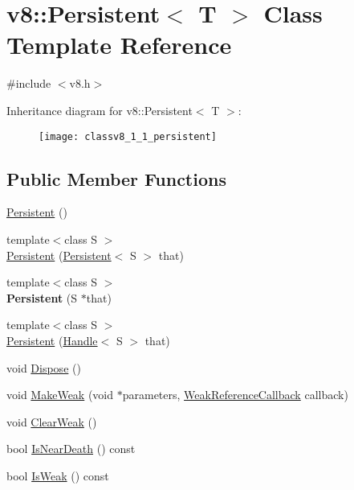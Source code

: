 \hypertarget{classv8_1_1_persistent}{}\section{v8\+:\+:Persistent$<$ T $>$ Class Template Reference}
\label{classv8_1_1_persistent}


{\ttfamily \#include $<$v8.\+h$>$}

Inheritance diagram for v8\+:\+:Persistent$<$ T $>$\+:\begin{figure}[H]
\begin{center}
\leavevmode
\texttt{[image: classv8\_1\_1\_persistent]}
\end{center}
\end{figure}
\subsection*{Public Member Functions}
\begin{DoxyCompactItemize}
\item 
\hyperlink{classv8_1_1_persistent_aff7516636baaf209885220f7cff34463}{Persistent} ()
\item 
{\footnotesize template$<$class S $>$ }\\\hyperlink{classv8_1_1_persistent_aea24de4ad0e6cd8e102411e11fbc3948}{Persistent} (\hyperlink{classv8_1_1_persistent}{Persistent}$<$ S $>$ that)
\item 
\hypertarget{classv8_1_1_persistent_a8050e41b31d6fbdf967957d6f5db2205}{}{\footnotesize template$<$class S $>$ }\\{\bfseries Persistent} (S $\ast$that)\label{classv8_1_1_persistent_a8050e41b31d6fbdf967957d6f5db2205}

\item 
{\footnotesize template$<$class S $>$ }\\\hyperlink{classv8_1_1_persistent_a89b49f1b1903a2d625d5c3100238276e}{Persistent} (\hyperlink{classv8_1_1_handle}{Handle}$<$ S $>$ that)
\item 
void \hyperlink{classv8_1_1_persistent_a33e53191844272ba0f2da4f55fc12297}{Dispose} ()
\item 
void \hyperlink{classv8_1_1_persistent_ab04609812113450bece2640ad0b27658}{Make\+Weak} (void $\ast$parameters, \hyperlink{namespacev8_a4d5db775dbc002b23f1b55ec7ce80ea5}{Weak\+Reference\+Callback} callback)
\item 
void \hyperlink{classv8_1_1_persistent_a30806c1125371c269a02ec03d47c69ab}{Clear\+Weak} ()
\item 
bool \hyperlink{classv8_1_1_persistent_a1f60b982c5e734df7e4fe22ccd5b62cf}{Is\+Near\+Death} () const 
\item 
bool \hyperlink{classv8_1_1_persistent_aa636a55b81eee222f86866dd5ae8c06f}{Is\+Weak} () const 
\end{DoxyCompactItemize}
